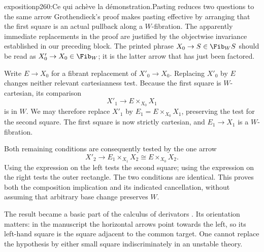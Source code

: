 \begin{dcomment}{exposition}{p260:Ce qui achève la démonstration.}{Pasting reduces two questions to the same arrow}
Grothendieck's proof makes pasting effective by arranging that the first square is an actual pullback along a $W$-fibration. The apparently immediate replacements in the proof are justified by the objectwise invariance established in our preceding block. The printed phrase $X_0\to S\in\Fib_W S$ should be read as $X'_0\to X_0\in\Fib_W$; it is the latter arrow that has just been factored.

Write $E\to X_0$ for a fibrant replacement of $X'_0\to X_0$. Replacing $X'_0$ by $E$ changes neither relevant cartesianness test. Because the first square is $W$-cartesian, its comparison
\[
 X'_1\longrightarrow E\times_{X_0}X_1
\]
is in $W$. We may therefore replace $X'_1$ by $E_1=E\times_{X_0}X_1$, preserving the test for the second square. The first square is now strictly cartesian, and $E_1\to X_1$ is a $W$-fibration.

Both remaining conditions are consequently tested by the one arrow
\[
 X'_2\longrightarrow E_1\times_{X_1}X_2
       \cong E\times_{X_0}X_2.
\]
Using the expression on the left tests the second square; using the expression on the right tests the outer rectangle. The two conditions are identical. This proves both the composition implication and its indicated cancellation, without assuming that arbitrary base change preserves $W$.

The result became a basic part of the calculus of derivators \citep[Proposition 3.13]{Groth2013}. Its orientation matters: in the manuscript the horizontal arrows point towards the left, so its left-hand square is the square adjacent to the common target. One cannot replace the hypothesis by either small square indiscriminately in an unstable theory.
\end{dcomment}

